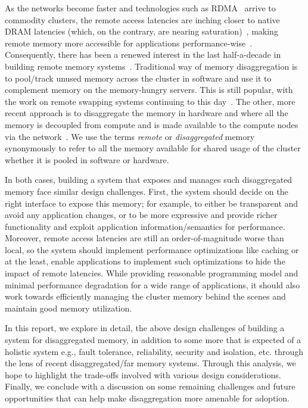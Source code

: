 As the networks become faster and technologies such as 
RDMA~\cite{farm,rocev2} arrive to commodity clusters, 
the remote access latencies are inching closer to native 
DRAM latencies (which, on the contrary, are nearing 
saturation)~\cite{Aguilera2017}, making remote memory more 
accessible for applications performance-wise~\cite{netdisagg}.
Consequently, there has been a renewed interest in 
the last half-a-decade in building remote memory 
systems~\cite{infiniswap,zswap,leap,fastswap,
legoos,kona,aifm,semeru,remregions,literdma}.
Traditional way of memory disaggregation is to pool/track  
unused memory across the cluster in software 
and use it to complement memory on the memory-hungry servers.
This is still popular, with the work on remote swapping systems 
continuing to this day~\cite{infiniswap,fastswap,zswap,leap}.
The other, more recent approach is to disaggregate the memory 
in hardware and where all the memory is decoupled from compute
and is made available to the compute nodes via 
the network~\cite{legoos,bladedisagg1,sonuma}. 
We use the terms \textit{remote} or 
\textit{disaggregated} memory synonymously to refer 
to all the memory available for shared usage of the cluster 
whether it is pooled in software or hardware. 

In both cases, building a system 
that exposes and manages such disaggregated memory face  
similar design challenges. First, the system should decide on
the right interface to expose this memory; for example,
to either be transparent and avoid any application changes, 
or to be more expressive and provide richer functionality and 
exploit application information/semantics for performance. 
Moreover, remote access 
latencies are still an order-of-magnitude worse than local, so the 
system should implement performance optimizations like caching 
or at the least, enable applications to implement such optimizations
to hide the impact of remote latencies. 
While providing reasonable programming model and minimal 
performance degradation
for a wide range of applications, it should also work towards 
efficiently managing the cluster memory behind the scenes and 
maintain good memory utilization. 

In this report, we explore in 
detail, the above design 
challenges of building a system for disaggregated memory, 
in addition to some more that is expected of a holistic 
system e.g., fault tolerance, reliability, security and 
isolation, etc. through the lens of recent disaggregated/far 
memory systems. Through this analysis, we hope to 
highlight the trade-offs involved with various design 
considerations. Finally, we conclude with a discussion on 
some remaining challenges and future opportunities that 
can help make disaggregation more amenable for adoption. 